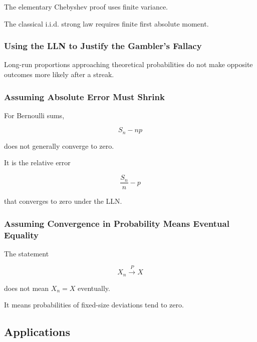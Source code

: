 The elementary Chebyshev proof uses finite variance.

The classical i.i.d. strong law requires finite first absolute moment.

\subsubsection{Using the LLN to Justify the Gambler's Fallacy}

Long-run proportions approaching theoretical probabilities do not make
opposite outcomes more likely after a streak.

\subsubsection{Assuming Absolute Error Must Shrink}

For Bernoulli sums,

\[
S_n-np
\]

does not generally converge to zero.

It is the relative error

\[
\frac{S_n}{n}-p
\]

that converges to zero under the LLN.

\subsubsection{Assuming Convergence in Probability Means Eventual Equality}

The statement

\[
X_n\xrightarrow{P}X
\]

does not mean \(X_n=X\) eventually.

It means probabilities of fixed-size deviations tend to zero.

\subsection{Applications}
\label{subsec:lln-applications}

